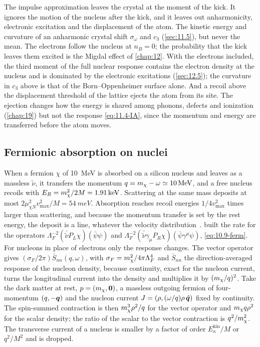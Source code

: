 The impulse approximation leaves the crystal at the moment of the kick. It ignores the motion of the nucleus after the kick, and it leaves out anharmonicity, electronic excitation and the displacement of the atom. The kinetic energy and curvature of an anharmonic crystal shift $\sigma_\omega$ and $c_3$ (\cref{sec:11.5}), but never the mean. The electrons follow the nucleus at $n_B = 0$; the probability that the kick leaves them excited is the Migdal effect of \cref{chap:12}. With the electrons included, the third moment of the full nuclear response contains the electron density at the nucleus and is dominated by the electronic excitations (\cref{sec:12.5}); the curvature in $c_3$ above is that of the Born--Oppenheimer surface alone. And a recoil above the displacement threshold of the lattice ejects the atom from its site. The ejection changes how the energy is shared among phonons, defects and ionization (\cref{chap:19}) but not the response \cref{eq:11.4-IA}, since the momentum and energy are transferred before the atom moves.

\subsection{Fermionic absorption on nuclei}

When a fermion $\chi$ of \SI{10}{MeV} is absorbed on a silicon nucleus and leaves as a massless $\tilde\nu$, it transfers the momentum $q = m_{\chi} - \omega \simeq \SI{10}{MeV}$, and a free nucleus recoils with $E_R = m_{\chi}^2/2M = \SI{1.91}{keV}$. Scattering at the same mass deposits at most $2\mu_{\chi N}^2v_{\mathrm{max}}^2/M = \SI{54}{meV}$. Absorption reaches recoil energies $1/4v_{\mathrm{max}}^2$ times larger than scattering, and because the momentum transfer is set by the rest energy, the deposit is a line, whatever the velocity distribution~\cite{dror2020direct}.  built the rate for the operators $\Lambda_F^{-2}(\bar{\tilde\nu}P_L\chi)(\bar\psi\psi)$ and $\Lambda_F^{-2}(\bar{\tilde\nu}\gamma_\mu P_R\chi)(\bar\psi\gamma^\mu\psi)$, \cref{eq:10.9-ferm}. For nucleons in place of electrons only the response changes. The vector operator gives $(\sigma_F/2\pi)\bar S_{nn}(q,\omega)$, with $\sigma_F = m_{\chi}^2/4\pi\Lambda_F^4$ and $\bar S_{nn}$ the direction-averaged response of the nucleon density, because continuity, exact for the nucleon current, turns the longitudinal current into the density and multiplies it by $(m_{\chi}/q)^2$. Take the dark matter at rest, $p = (m_{\chi}, \bm{0})$, a massless outgoing fermion of four-momentum $(q, -\bm{q})$ and the nucleon current $J = (\rho, (\omega/q)\rho\,\hat{\bm{q}})$ fixed by continuity. The spin-summed contraction is then $m_{\chi}^3\rho^2/q$ for the vector operator and $m_{\chi} q\rho^2$ for the scalar density; the ratio of the scalar to the vector contraction is $q^2/m_{\chi}^2$. The transverse current of a nucleus is smaller by a factor of order $E^{\mathrm{kin}}_\kappa/M$ or $q^2/M^2$ and is dropped.

